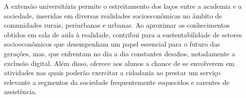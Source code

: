 A extensão universitária permite o estreitamento dos laços entre a academia e a sociedade, inseridas em diversas realidades socioeconômicas no âmbito de comunidades rurais, periurbanas e urbanas. Ao aproximar os conhecimentos obtidos em sala de aula à realidade, contribui para a sustentabilidade de setores socioeconômicos que desempenham um papel essencial para o futuro das gerações, mas, que enfrentam no dia a dia constantes desafios, notadamente a exclusão digital. Além disso, oferece aos alunos a chance de se envolverem em atividades nas quais poderão exercitar a cidadania ao prestar um serviço relevante a segmentos da sociedade frequentemente esquecidos e carentes de assistência.

